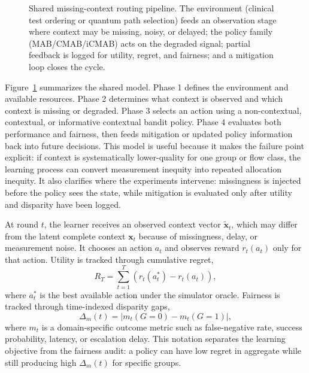 \documentclass[conference]{IEEEtran}
\begin{document}
\begin{figure}[t]
{}
\caption{Shared missing-context routing pipeline. The environment (clinical
test ordering or quantum path selection) feeds an observation stage where
context may be missing, noisy, or delayed; the policy family (MAB/CMAB/iCMAB)
acts on the degraded signal; partial feedback is logged for utility, regret,
and fairness; and a mitigation loop closes the cycle.}
\label{fig:domain_model}
\end{figure}

Figure~\ref{fig:domain_model} summarizes the shared model. Phase 1 defines
the environment and available resources. Phase 2 determines what context is
observed and which context is missing or degraded. Phase 3 selects an action
using a non-contextual, contextual, or informative contextual bandit policy.
Phase 4 evaluates both performance and fairness, then feeds mitigation or
updated policy information back into future decisions. This model is useful
because it makes the failure point explicit: if context is systematically
lower-quality for one group or flow class, the learning process can convert
measurement inequity into repeated allocation inequity. It also clarifies where
the experiments intervene: missingness is injected before the policy sees the
state, while mitigation is evaluated only after utility and disparity have been
logged.

At round $t$, the learner receives an observed context vector
$\tilde{\mathbf{x}}_t$, which may differ from the latent complete context
$\mathbf{x}_t$ because of missingness, delay, or measurement noise. It chooses
an action $a_t$ and observes reward $r_t(a_t)$ only for that action. Utility is
tracked through cumulative regret,
\begin{equation}
R_T = \sum_{t=1}^{T} \left(r_t(a_t^*) - r_t(a_t)\right),
\label{eq:regret}
\end{equation}
where $a_t^*$ is the best available action under the simulator oracle.
Fairness is tracked through time-indexed disparity gaps,
\begin{equation}
\Delta_m(t) =
\left|m_t(G=0) - m_t(G=1)\right|,
\label{eq:gap}
\end{equation}
where $m_t$ is a domain-specific outcome metric such as false-negative rate,
success probability, latency, or escalation delay. This notation separates the
learning objective from the fairness audit: a policy can have low regret in
aggregate while still producing high $\Delta_m(t)$ for specific groups.
\end{document}

